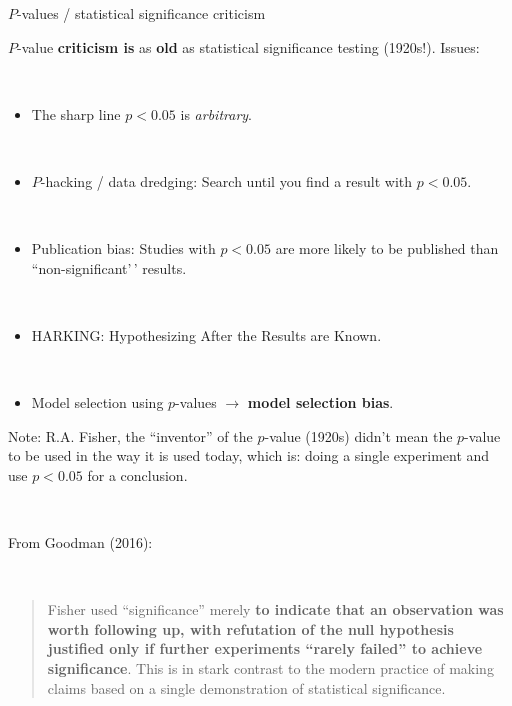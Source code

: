 \documentclass[
  10pt,
  ignorenonframetext,
]{beamer}
\providecommand{\tightlist}{%
  \setlength{\itemsep}{0pt}\setlength{\parskip}{0pt}}
\begin{document}
\begin{frame}
\begin{block}{\(P\)-values / statistical significance criticism}
\protect\hypertarget{p-values-statistical-significance-criticism}{}
\(~\)

\(P\)-value \textbf{criticism is} as \textbf{old} as statistical
significance testing (1920s!). Issues:

\(~\)

\begin{itemize}
\tightlist
\item
  The sharp line \(p<0.05\) is \emph{arbitrary}.
\end{itemize}

\(~\)

\begin{itemize}
\tightlist
\item
  \(P\)-hacking / data dredging: Search until you find a result with
  \(p<0.05\).
\end{itemize}

\(~\)

\begin{itemize}
\tightlist
\item
  Publication bias: Studies with \(p<0.05\) are more likely to be
  published than ``non-significant'\,' results.
\end{itemize}

\(~\)

\begin{itemize}
\tightlist
\item
  HARKING: Hypothesizing After the Results are Known.
\end{itemize}

\(~\)

\begin{itemize}
\tightlist
\item
  Model selection using \(p\)-values \(\rightarrow\) \textbf{model
  selection bias}.
\end{itemize}
\end{block}
\end{frame}

\begin{frame}
Note: R.A. Fisher, the ``inventor'' of the \(p\)-value (1920s) didn't
mean the \(p\)-value to be used in the way it is used today, which is:
doing a single experiment and use \(p<0.05\) for a conclusion.

\(~\)

From Goodman (2016):

\(~\)

\begin{quote}
Fisher used ``significance'' merely \textbf{to indicate that an
observation was worth following up, with refutation of the null
hypothesis justified only if further experiments ``rarely failed'' to
achieve significance}. This is in stark contrast to the modern practice
of making claims based on a single demonstration of statistical
significance.
\end{quote}

\(~\)

\pause

\centering
\end{frame}
\end{document}
